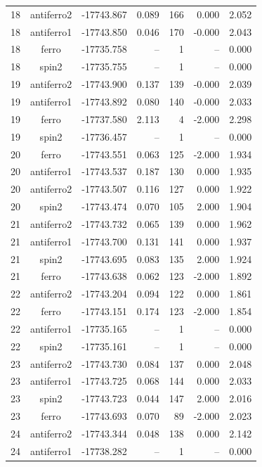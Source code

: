 \begin{longtable}{@{}ccrrrrr@{}}
\rowcolor{gray!20} 18 & antiferro2 & -17743.867 & 0.089 & 166 & 0.000 & 2.052 \\
18 & antiferro1 & -17743.850 & 0.046 & 170 & -0.000 & 2.043 \\
18 & ferro & -17735.758 & -- & 1 & -- & 0.000 \\
18 & spin2 & -17735.755 & -- & 1 & -- & 0.000 \\
\rowcolor{gray!20} 19 & antiferro2 & -17743.900 & 0.137 & 139 & -0.000 & 2.039 \\
19 & antiferro1 & -17743.892 & 0.080 & 140 & -0.000 & 2.033 \\
19 & ferro & -17737.580 & 2.113 & 4 & -2.000 & 2.298 \\
19 & spin2 & -17736.457 & -- & 1 & -- & 0.000 \\
\rowcolor{gray!20} 20 & ferro & -17743.551 & 0.063 & 125 & -2.000 & 1.934 \\
20 & antiferro1 & -17743.537 & 0.187 & 130 & 0.000 & 1.935 \\
20 & antiferro2 & -17743.507 & 0.116 & 127 & 0.000 & 1.922 \\
20 & spin2 & -17743.474 & 0.070 & 105 & 2.000 & 1.904 \\
\rowcolor{gray!20} 21 & antiferro2 & -17743.732 & 0.065 & 139 & 0.000 & 1.962 \\
21 & antiferro1 & -17743.700 & 0.131 & 141 & 0.000 & 1.937 \\
21 & spin2 & -17743.695 & 0.083 & 135 & 2.000 & 1.924 \\
21 & ferro & -17743.638 & 0.062 & 123 & -2.000 & 1.892 \\
\rowcolor{gray!20} 22 & antiferro2 & -17743.204 & 0.094 & 122 & 0.000 & 1.861 \\
22 & ferro & -17743.151 & 0.174 & 123 & -2.000 & 1.854 \\
22 & antiferro1 & -17735.165 & -- & 1 & -- & 0.000 \\
22 & spin2 & -17735.161 & -- & 1 & -- & 0.000 \\
\rowcolor{gray!20} 23 & antiferro2 & -17743.730 & 0.084 & 137 & 0.000 & 2.048 \\
23 & antiferro1 & -17743.725 & 0.068 & 144 & 0.000 & 2.033 \\
23 & spin2 & -17743.723 & 0.044 & 147 & 2.000 & 2.016 \\
23 & ferro & -17743.693 & 0.070 & 89 & -2.000 & 2.023 \\
\rowcolor{gray!20} 24 & antiferro2 & -17743.344 & 0.048 & 138 & 0.000 & 2.142 \\
24 & antiferro1 & -17738.282 & -- & 1 & -- & 0.000 \\

\end{longtable}
